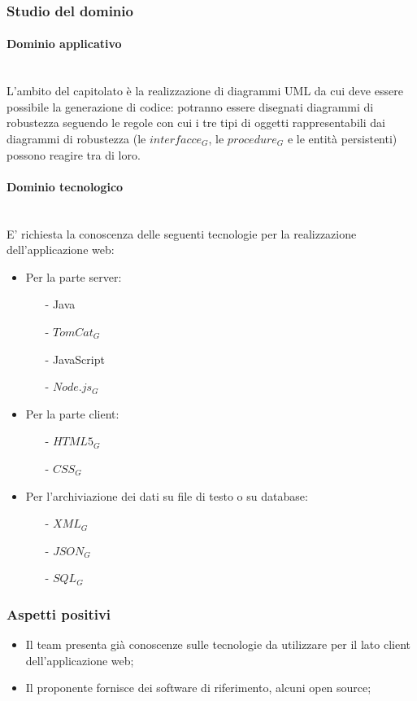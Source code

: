 		\subsubsection{Studio del dominio}
			\paragraph{Dominio applicativo}
			\mbox{}\\
			L'ambito del capitolato è la realizzazione di diagrammi UML da cui deve essere possibile la generazione di codice: potranno essere disegnati diagrammi di robustezza seguendo le regole con cui i tre tipi di oggetti rappresentabili dai diagrammi di robustezza (le $interfacce_G$, le $procedure_G$ e le entità persistenti) possono reagire tra di loro.
			\paragraph{Dominio tecnologico}
			\mbox{}\\
			E' richiesta la conoscenza delle seguenti tecnologie per la realizzazione dell'applicazione web:
				\begin{itemize}
					\item Per la parte server:
					\begin{itemize}
						\item[-] Java
						\item[-] $TomCat_G$
						\item[-] JavaScript
						\item[-] $Node.js_G$
					\end{itemize}
					\item Per la parte client:
					\begin{itemize}
						\item[-] $HTML5_G$
						\item[-] $CSS_G$
					\end{itemize}
					\item Per l'archiviazione dei dati su file di testo o su database:
					\begin{itemize}
						\item[-] $XML_G$
						\item[-] $JSON_G$
						\item[-] $SQL_G$
					\end{itemize}
				\end{itemize}
		\subsubsection{Aspetti positivi}
		\begin{itemize}
			\item Il team presenta già conoscenze sulle tecnologie da utilizzare per il lato client dell'applicazione web;
			\item Il proponente fornisce dei software di riferimento, alcuni open source;
		\end{itemize}
